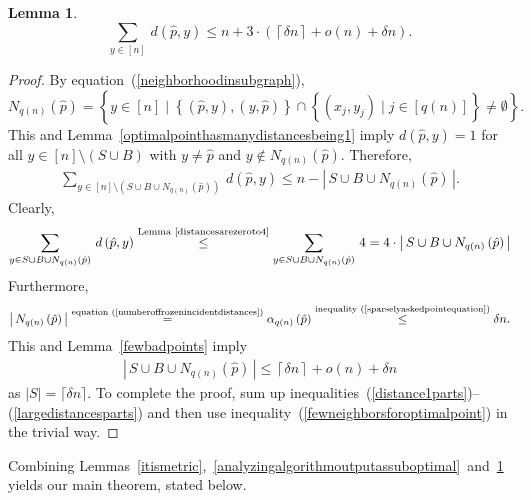 \documentclass[letterpaper,12pt]{article}
\newtheorem{lemma}[theorem]{Lemma}
\begin{document}
\begin{lemma}\label{analyzingoptimalpoint}
$$\sum_{y\in[n]}\,d\left(\hat{p},y\right)
\le
n+3\cdot\left(\left\lceil\delta n\right\rceil+o(n)+\delta n\right).
$$
\end{lemma}
\begin{proof}
By equation~(\ref{neighborhoodinsubgraph}),
$$N_{q(n)}\left(\hat{p}\right)
=\left\{
y\in[n]\mid
\left\{
\left(\hat{p},y\right), \left(y,\hat{p}\right)
\right\}
\cap \left\{\left(x_j,y_j\right)\mid
j\in\left[q(n)\right]\right\}
\neq\emptyset
\right\}.$$
This and
Lemma~\ref{optimalpointhasmanydistancesbeing1} imply
$d(\hat{p},y)=1$ for all $y\in [n]\setminus(S\cup B)$ with
$y\neq \hat{p}$ and
$y\notin N_{q(n)}(\hat{p})$.
Therefore,
\begin{eqnarray}
\sum_{y\in [n]\setminus(S\cup B\cup
N_{q(n)}(\hat{p}))}\,d\left(\hat{p},y\right)
\le
n-\left|\,S\cup B\cup
N_{q(n)}\left(\hat{p}\right)\,\right|.
\label{distance1parts}
\end{eqnarray}
Clearly,
\begin{eqnarray}
\sum_{y\in S\cup B\cup N_{q(n)}(\hat{p})}\,d\left(\hat{p},y\right)
\stackrel{\text{Lemma~\ref{distancesarezeroto4}}}{\le}
\sum_{y\in S\cup B\cup N_{q(n)}(\hat{p})}\,4
= 4\cdot\left|\,S\cup B\cup
N_{q(n)}\left(\hat{p}\right)\,\right|
\label{largedistancesparts}
\end{eqnarray}
Furthermore,
\begin{eqnarray}
\left|\,N_{q(n)}\left(\hat{p}\right)\,\right|
\stackrel{\text{equation~(\ref{numberoffrozenincidentdistances})}}{=}
\alpha_{q(n)}\left(\hat{p}\right)
\stackrel{\text{inequality~(\ref{sparselyaskedpointequation})}}{\le}
\delta n.\nonumber
\end{eqnarray}
This and Lemma~\ref{fewbadpoints}
imply
\begin{eqnarray}
\left|\,S\cup B\cup N_{q(n)}\left(\hat{p}\right)\,\right|
\le \left\lceil\delta n\right\rceil+o(n)+\delta n
\label{fewneighborsforoptimalpoint}
\end{eqnarray}
as $|S|=\lceil\delta n\rceil$.
To complete the proof, sum
up
inequalities~(\ref{distance1parts})--(\ref{largedistancesparts})
and then use
inequality~(\ref{fewneighborsforoptimalpoint})
in the trivial way.
\end{proof}



Combining
Lemmas~\ref{itismetric},~\ref{analyzingalgorithmoutputassuboptimal}~and~\ref{analyzingoptimalpoint}
yields our main theorem, stated below.
\end{document}
